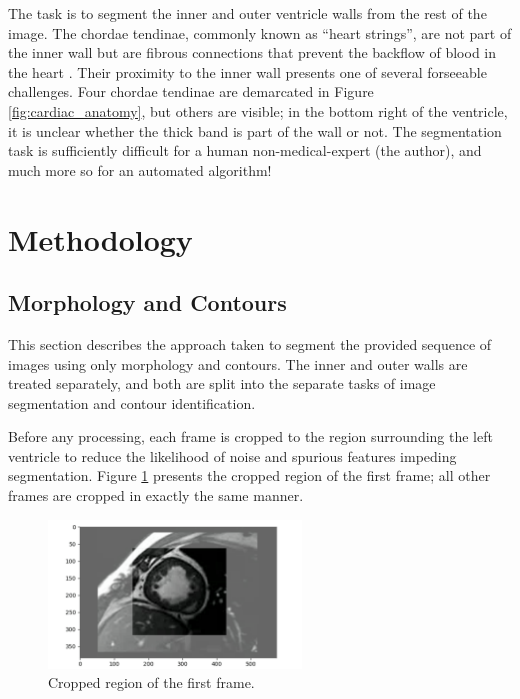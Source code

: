 The task is to segment the inner and outer ventricle walls from the rest of the image. The chordae tendinae, commonly known as ``heart strings'', are not part of the inner wall but are fibrous connections that prevent the backflow of blood in the heart \cite{gunnal_2015}. Their proximity to the inner wall presents one of several forseeable challenges. Four chordae tendinae are demarcated in Figure \ref{fig:cardiac_anatomy}, but others are visible; in the bottom right of the ventricle, it is unclear whether the thick band is part of the wall or not. The segmentation task is sufficiently difficult for a human non-medical-expert (the author), and much more so for an automated algorithm!

\newpage
\section{Methodology}

\subsection{Morphology and Contours}

This section describes the approach taken to segment the provided sequence of images using only morphology and contours. The inner and outer walls are treated separately, and both are split into the separate tasks of image segmentation and contour identification.

Before any processing, each frame is cropped to the region surrounding the left ventricle to reduce the likelihood of noise and spurious features impeding segmentation. Figure \ref{fig:frame_cropping} presents the cropped region of the first frame; all other frames are cropped in exactly the same manner.

\begin{figure}[ht]
  \centering
  \includegraphics[width=0.6\textwidth]{images/q1_frame_cropping.png}
  \caption{Cropped region of the first frame.}
  \label{fig:frame_cropping}
\end{figure}

